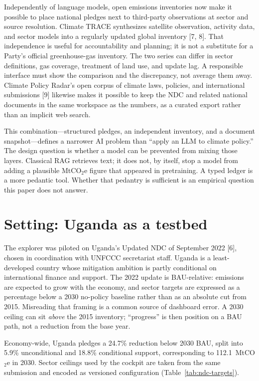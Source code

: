 \documentclass{article}
\begin{document}
Independently of language models, open emissions inventories now make it possible to place national pledges next to third-party observations at sector and source resolution. Climate TRACE synthesizes satellite observation, activity data, and sector models into a regularly updated global inventory [7, 8]. That independence is useful for accountability and planning; it is not a substitute for a Party's official greenhouse-gas inventory. The two series can differ in sector definitions, gas coverage, treatment of land use, and update lag. A responsible interface must show the comparison and the discrepancy, not average them away. Climate Policy Radar's open corpus of climate laws, policies, and international submissions [9] likewise makes it possible to keep the NDC and related national documents in the same workspace as the numbers, as a curated export rather than an implicit web search.

This combination---structured pledges, an independent inventory, and a document snapshot---defines a narrower AI problem than ``apply an LLM to climate policy.'' The design question is whether a model can be prevented from mixing those layers. Classical RAG retrieves text; it does not, by itself, stop a model from adding a plausible MtCO$_2$e figure that appeared in pretraining. A typed ledger is a more pedantic tool. Whether that pedantry is sufficient is an empirical question this paper does not answer.

\section{Setting: Uganda as a testbed}
\label{sec:setting}

The explorer was piloted on Uganda's Updated NDC of September 2022 [6], chosen in coordination with UNFCCC secretariat staff. Uganda is a least-developed country whose mitigation ambition is partly conditional on international finance and support. The 2022 update is BAU-relative: emissions are expected to grow with the economy, and sector targets are expressed as a percentage below a 2030 no-policy baseline rather than as an absolute cut from 2015. Misreading that framing is a common source of dashboard error. A 2030 ceiling can sit \emph{above} the 2015 inventory; ``progress'' is then position on a BAU path, not a reduction from the base year.

Economy-wide, Uganda pledges a 24.7\% reduction below 2030 BAU, split into 5.9\% unconditional and 18.8\% conditional support, corresponding to 112.1~MtCO$_2$e in 2030. Sector ceilings used by the cockpit are taken from the same submission and encoded as versioned configuration (Table~\ref{tab:ndc-targets}).
\end{document}

